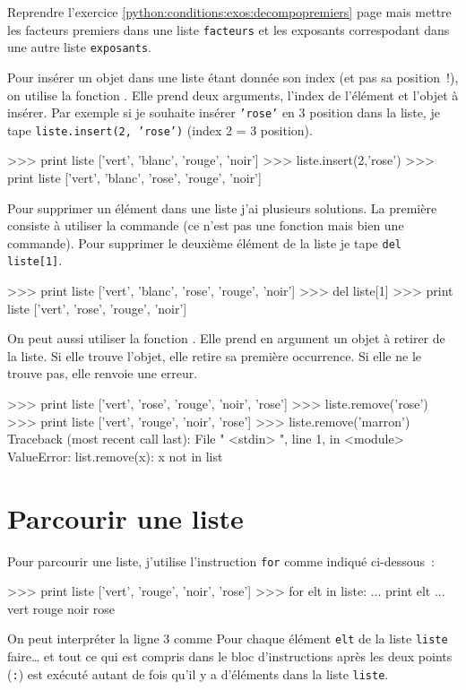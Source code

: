 \begin{exercice}
Reprendre l'exercice \ref{python:conditions:exos:decompopremiers} page \pageref{python:conditions:exos:decompopremiers} mais mettre les facteurs premiers dans une liste \texttt{facteurs} et les exposants
correspodant dans une autre liste  \texttt{exposants}.
\end{exercice}

Pour insérer un objet dans une liste étant donnée son index (et pas sa position~!), on utilise la fonction . Elle prend deux arguments, l'index de l'élément et l'objet à insérer. Par exemple si je souhaite insérer \texttt{'rose'} en 3\ieme{} position dans la liste, je tape \texttt{liste.insert(2, 'rose')} (index 2 = 3\ieme{} position).
\begin{pythoncode}
>>> print liste
['vert', 'blanc', 'rouge', 'noir']
>>> liste.insert(2,'rose')
>>> print liste
['vert', 'blanc', 'rose', 'rouge', 'noir']
\end{pythoncode}


Pour supprimer un élément dans une liste j'ai plusieurs solutions. La première consiste à utiliser la commande  (ce n'est pas une fonction mais bien une commande). Pour supprimer le deuxième élément de la liste je tape \texttt{del liste[1]}.

\begin{pythoncode}
>>> print liste
['vert', 'blanc', 'rose', 'rouge', 'noir']
>>> del liste[1]
>>> print liste
['vert', 'rose', 'rouge', 'noir']
\end{pythoncode}

On peut aussi utiliser la fonction . Elle prend en argument un objet à retirer de la  liste. Si elle trouve l'objet, elle retire sa première occurrence. Si elle ne le trouve pas, elle renvoie une erreur.

\begin{pythoncode}
>>> print liste
['vert', 'rose', 'rouge', 'noir', 'rose']
>>> liste.remove('rose')
>>> print liste
['vert', 'rouge', 'noir', 'rose']
>>> liste.remove('marron')
Traceback (most recent call last):
  File " <stdin> ", line 1, in <module>
ValueError: list.remove(x): x not in list
\end{pythoncode}


\section{Parcourir une liste}
Pour parcourir une liste, j'utilise l'instruction \texttt{for} comme indiqué ci-dessous~:
\begin{pythoncode}
>>> print liste
['vert', 'rouge', 'noir', 'rose']
>>> for elt in liste:
...    print elt
...
vert
rouge
noir
rose
\end{pythoncode}
On peut interpréter la ligne 3 comme \og Pour chaque élément \texttt{elt} de la liste \texttt{liste} faire\dots \fg{} et tout ce qui est compris dans le bloc d'instructions après les deux points (\texttt{:}) est exécuté autant de fois qu'il y a d'éléments dans la liste \texttt{liste}.

